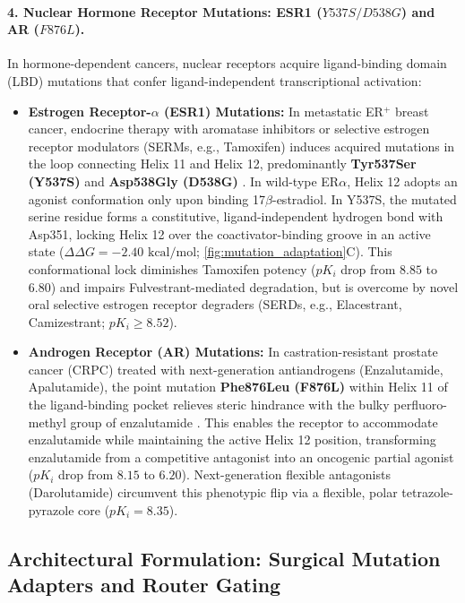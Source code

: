 \documentclass{article}
\theoremstyle{definition}
\begin{document}
\paragraph{4. Nuclear Hormone Receptor Mutations: ESR1 ($Y537S/D538G$) and AR ($F876L$).}
In hormone-dependent cancers, nuclear receptors acquire ligand-binding domain (LBD) mutations that confer ligand-independent transcriptional activation:
\begin{itemize}
    \item \textbf{Estrogen Receptor-$\alpha$ (ESR1) Mutations:} In metastatic ER$^+$ breast cancer, endocrine therapy with aromatase inhibitors or selective estrogen receptor modulators (SERMs, e.g., Tamoxifen) induces acquired mutations in the loop connecting Helix 11 and Helix 12, predominantly \textbf{Tyr537Ser (Y537S)} and \textbf{Asp538Gly (D538G)} \citep{toy2013esr1}. In wild-type ER$\alpha$, Helix 12 adopts an agonist conformation only upon binding 17$\beta$-estradiol. In Y537S, the mutated serine residue forms a constitutive, ligand-independent hydrogen bond with Asp351, locking Helix 12 over the coactivator-binding groove in an active state ($\Delta\Delta G = -2.40\text{ kcal/mol}$; \cref{fig:mutation_adaptation}C). This conformational lock diminishes Tamoxifen potency ($pK_i$ drop from $8.85$ to $6.80$) and impairs Fulvestrant-mediated degradation, but is overcome by novel oral selective estrogen receptor degraders (SERDs, e.g., Elacestrant, Camizestrant; $pK_i \ge 8.52$).
    \item \textbf{Androgen Receptor (AR) Mutations:} In castration-resistant prostate cancer (CRPC) treated with next-generation antiandrogens (Enzalutamide, Apalutamide), the point mutation \textbf{Phe876Leu (F876L)} within Helix 11 of the ligand-binding pocket relieves steric hindrance with the bulky perfluoro-methyl group of enzalutamide \citep{joseph2013mutation}. This enables the receptor to accommodate enzalutamide while maintaining the active Helix 12 position, transforming enzalutamide from a competitive antagonist into an oncogenic partial agonist ($pK_i$ drop from $8.15$ to $6.20$). Next-generation flexible antagonists (Darolutamide) circumvent this phenotypic flip via a flexible, polar tetrazole-pyrazole core ($pK_i = 8.35$).
\end{itemize}

\subsection{Architectural Formulation: Surgical Mutation Adapters and Router Gating}
\label{subsec:oncology_architecture}
\end{document}
